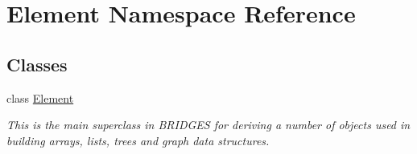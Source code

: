 \hypertarget{namespace_element}{}\section{Element Namespace Reference}
\label{namespace_element}
\subsection*{Classes}
\begin{DoxyCompactItemize}
\item 
class \hyperlink{class_element_1_1_element}{Element}
\begin{DoxyCompactList}\small\item\em This is the main superclass in B\+R\+I\+D\+G\+E\+S for deriving a number of objects used in building arrays, lists, trees and graph data structures. \end{DoxyCompactList}\end{DoxyCompactItemize}
